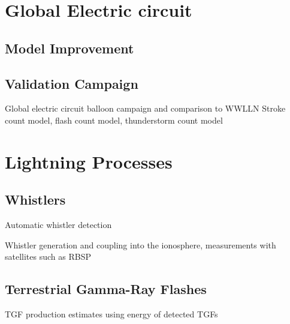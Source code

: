 \section{Global Electric circuit}

\subsection{Model Improvement}

\subsection{Validation Campaign}

Global electric circuit balloon campaign and comparison to WWLLN
  Stroke count model, flash count model, thunderstorm count model

\section{Lightning Processes}

\subsection{Whistlers}

  Automatic whistler detection

Whistler generation and coupling into the ionosphere, measurements with satellites such as RBSP

\subsection{Terrestrial Gamma-Ray Flashes}

 TGF production estimates using energy of detected TGFs





